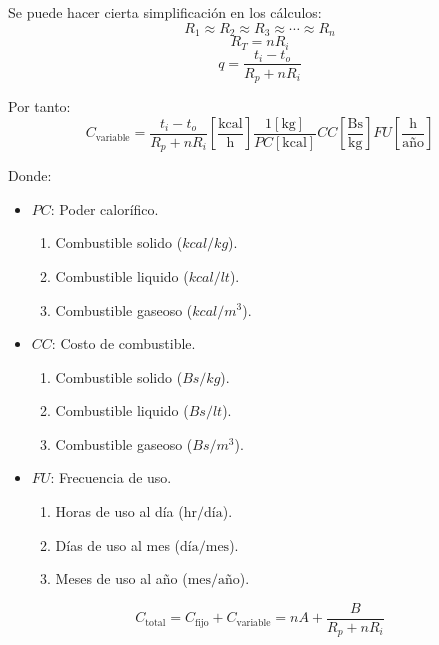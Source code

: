 Se puede hacer cierta simplificación en los cálculos:
\begin{equation*}
    R_1\approx R_2\approx R_3\approx\cdots\approx R_n
\end{equation*}
\begin{equation*}
    R_T=nR_i
\end{equation*}
\begin{equation*}
    q=\frac{t_i-t_o}{R_p+nR_i}
\end{equation*}

Por tanto:
\begin{equation*}
    C_{\text{variable}}=\frac{t_i-t_o}{R_p+nR_i}
    \left[\frac{\text{kcal}}{\text{h}}\right]
    \frac{1[\text{kg}]}{PC[\text{kcal}]}
    CC\left[\frac{\text{Bs}}{\text{kg}}\right]
    FU\left[\frac{\text{h}}{\text{año}}\right]
\end{equation*}

Donde:
\begin{itemize}
    \item $PC$: Poder calorífico.
        \begin{enumerate}
            \item Combustible solido ($kcal/kg$).
            \item Combustible liquido ($kcal/lt$).
            \item Combustible gaseoso ($kcal/m^3$).
        \end{enumerate}
    \item $CC$: Costo de combustible.
        \begin{enumerate}
            \item Combustible solido ($Bs/kg$).
            \item Combustible liquido ($Bs/lt$).
            \item Combustible gaseoso ($Bs/m^3$).
        \end{enumerate}
    \item $FU$: Frecuencia de uso.
        \begin{enumerate}
            \item Horas de uso al día ($\text{hr}/\text{día}$).
            \item Días de uso al mes ($\text{día}/\text{mes}$).
            \item Meses de uso al año ($\text{mes}/\text{año}$).
        \end{enumerate}
\end{itemize}

\begin{equation}
    C_{\text{total}}=C_{\text{fijo}}+C_{\text{variable}}=nA+\frac{B}{R_p+nR_i}
\end{equation}

